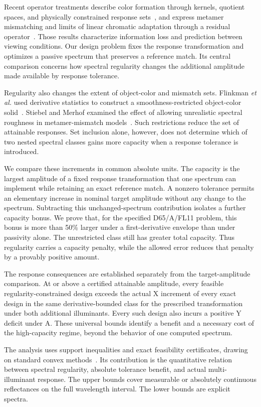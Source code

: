 \documentclass{optica-article}
\begin{document}
Recent operator treatments describe color formation through kernels, quotient spaces, and physically constrained response sets~\cite{Morovic2026Quotient}, and express metamer mismatching and limits of linear chromatic adaptation through a residual operator~\cite{Morovic2026Mismatch}. Those results characterize information loss and prediction between viewing conditions. Our design problem fixes the response transformation and optimizes a passive spectrum that preserves a reference match. Its central comparison concerns how spectral regularity changes the additional amplitude made available by response tolerance.

Regularity also changes the extent of object-color and mismatch sets. Flinkman \emph{et al.} used derivative statistics to construct a smoothness-restricted object-color solid~\cite{Flinkman2012}. Stiebel and Merhof examined the effect of allowing unrealistic spectral roughness in metamer-mismatch models~\cite{Stiebel2017}. Such restrictions reduce the set of attainable responses. Set inclusion alone, however, does not determine which of two nested spectral classes gains more capacity when a response tolerance is introduced.

We compare these increments in common absolute units. The capacity is the largest amplitude of a fixed response transformation that one spectrum can implement while retaining an exact reference match. A nonzero tolerance permits an elementary increase in nominal target amplitude without any change to the spectrum. Subtracting this unchanged-spectrum contribution isolates a further capacity bonus. We prove that, for the specified D65/A/FL11 problem, this bonus is more than 50\% larger under a first-derivative envelope than under passivity alone. The unrestricted class still has greater total capacity. Thus regularity carries a capacity penalty, while the allowed error reduces that penalty by a provably positive amount.

The response consequences are established separately from the target-amplitude comparison. At or above a certified attainable amplitude, every feasible regularity-constrained design exceeds the actual X increment of every exact design in the same derivative-bounded class for the prescribed transformation under both additional illuminants. Every such design also incurs a positive Y deficit under A. These universal bounds identify a benefit and a necessary cost of the high-capacity regime, beyond the behavior of one computed spectrum.

The analysis uses support inequalities and exact feasibility certificates, drawing on standard convex methods~\cite{Boyd2004}. Its contribution is the quantitative relation between spectral regularity, absolute tolerance benefit, and actual multi-illuminant response. The upper bounds cover measurable or absolutely continuous reflectances on the full wavelength interval. The lower bounds are explicit spectra. 
\end{document}
